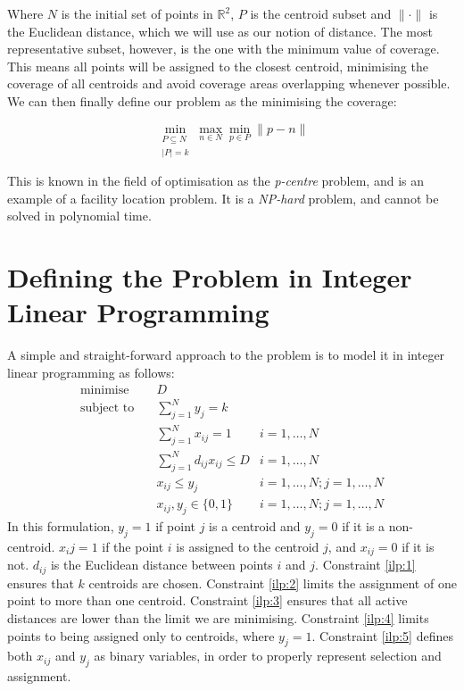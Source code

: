 \noindent
Where $N$ is the initial set of points in $\mathbb{R}^2$, $P$ is the centroid subset and $\lVert \cdot \rVert $ is the Euclidean distance, which we will use as our notion of distance.
The most representative subset, however, is the one with the minimum value of coverage. This means all points will be assigned to the closest centroid, minimising the coverage of all centroids and avoid coverage areas overlapping whenever possible.
We can then finally define our problem as the minimising the coverage:

\begin{equation}
\min_{\substack{P \subseteq N\\ \lvert P \rvert = k}}{\max_{n \in N}{\min_{p \in P}{\lVert p-n \rVert}}}
\end{equation}

\noindent
This is known in the field of optimisation as the \textit{p-centre} problem, and is an example of a facility location problem. It is a \textit{NP-hard} problem, and cannot be solved in polynomial time.

\section{Defining the Problem in Integer Linear Programming}
A simple and straight-forward approach to the problem is to model it in  integer linear programming as follows:
\begin{align}
\text{minimise}   \quad& D							   &\\
\text{subject to} \quad
				& \sum\limits_{j=1}^{N}{y_j} = k 
					& 							\label{ilp:1}\\
				& \sum\limits_{j=1}^{N}{x_{ij}}	= 1   
					& i=1,\ldots,N 				\label{ilp:2}\\
				& \sum\limits_{j=1}^{N}{d_{ij} x_{ij}} \leq D
					& i=1,\ldots,N				\label{ilp:3}\\
				& x_{ij} \leq y_{j}				   
					& i=1,\ldots,N;j=1,\ldots,N	\label{ilp:4}\\
				& x_{ij},y_{j} \in \{0,1\}
					& i=1,\ldots,N;j=1,\ldots,N \label{ilp:5}
\end{align}
In this formulation, $y_j = 1$ if point $j$ is a centroid and $y_j = 0$ if it is a non-centroid.
$x_ij = 1$ if the point $i$ is assigned to the centroid $j$, and $x_{ij}=0$ if it is not.
$d_{ij}$ is the Euclidean distance between points $i$ and $j$.
Constraint \ref{ilp:1} ensures that $k$ centroids are chosen.
Constraint \ref{ilp:2} limits the assignment of one point to more than one centroid.
Constraint \ref{ilp:3} ensures that all active distances are lower than the limit we are minimising.
Constraint \ref{ilp:4} limits points to being assigned only to centroids, where $y_j=1$.
Constraint \ref{ilp:5} defines both $x_{ij}$ and $y_j$ as binary variables, in order to properly represent selection and assignment.
